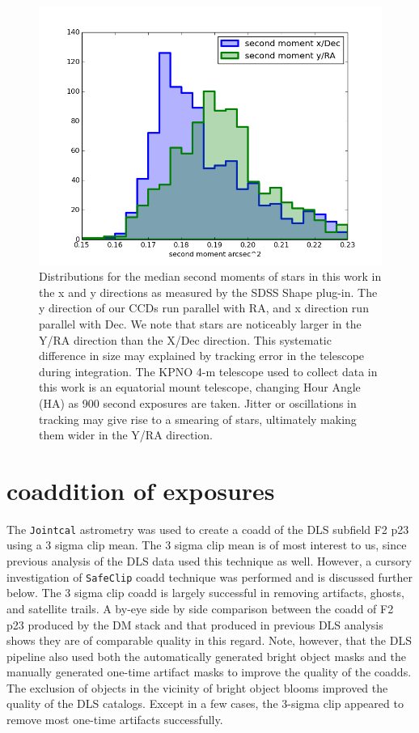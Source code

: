 \documentclass[DM,toc]{lsstdoc}
\begin{document}
\begin{figure}
    \includegraphics[width=.9\textwidth]{second_moments.png}
    \caption{Distributions for the median second moments of stars in this work in the x and y directions as measured by the SDSS Shape plug-in. The y direction of our CCDs run parallel with RA, and x direction run parallel with Dec. We note that stars are noticeably larger in the Y/RA direction than the X/Dec direction. This systematic difference in size may explained by tracking error in the telescope during integration. The KPNO 4-m telescope used to collect data in this work is an equatorial mount telescope, changing Hour Angle (HA) as 900 second exposures are taken. Jitter or oscillations in tracking may give rise to a smearing of stars, ultimately making them wider in the Y/RA direction.}
\end{figure}

\section{coaddition of exposures}
The {\tt\string Jointcal} astrometry was used to create a coadd of the DLS subfield F2 p23 using a 3 sigma clip mean. The 3 sigma clip mean is of most interest to us, since previous analysis of the DLS data used this technique as well. However, a cursory investigation of {\tt\string SafeClip} coadd technique was performed and is discussed further below.
The 3 sigma clip coadd is largely successful in removing artifacts, ghosts, and satellite trails. A by-eye side by side comparison between the coadd of F2 p23 produced by the DM stack and that produced in previous DLS analysis shows they are of comparable quality in this regard.
Note, however, that the DLS pipeline also used both the automatically generated bright object masks and the manually generated one-time artifact masks to improve the quality of the coadds. The exclusion of objects in the vicinity of bright object blooms improved the quality of the DLS catalogs. Except in a few cases, the 3-sigma clip appeared to remove most one-time artifacts successfully.
\end{document}
